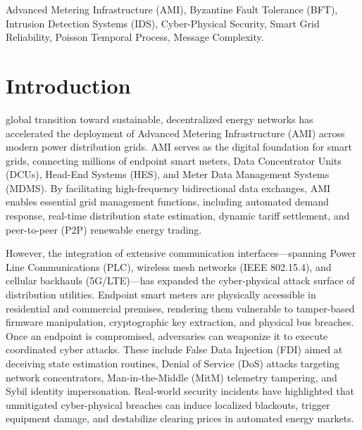 \documentclass[10pt,twocolumn,journal]{IEEEtran}
\begin{document}
\begin{IEEEkeywords}
Advanced Metering Infrastructure (AMI), Byzantine Fault Tolerance (BFT), Intrusion Detection Systems (IDS), Cyber-Physical Security, Smart Grid Reliability, Poisson Temporal Process, Message Complexity.
\end{IEEEkeywords}

\section{Introduction}
\label{sec:introduction}

 global transition toward sustainable, decentralized energy networks has accelerated the deployment of Advanced Metering Infrastructure (AMI) across modern power distribution grids. AMI serves as the digital foundation for smart grids, connecting millions of endpoint smart meters, Data Concentrator Units (DCUs), Head-End Systems (HES), and Meter Data Management Systems (MDMS). By facilitating high-frequency bidirectional data exchanges, AMI enables essential grid management functions, including automated demand response, real-time distribution state estimation, dynamic tariff settlement, and peer-to-peer (P2P) renewable energy trading.

However, the integration of extensive communication interfaces---spanning Power Line Communications (PLC), wireless mesh networks (IEEE 802.15.4), and cellular backhauls (5G/LTE)---has expanded the cyber-physical attack surface of distribution utilities. Endpoint smart meters are physically accessible in residential and commercial premises, rendering them vulnerable to tamper-based firmware manipulation, cryptographic key extraction, and physical bus breaches. Once an endpoint is compromised, adversaries can weaponize it to execute coordinated cyber attacks. These include False Data Injection (FDI) aimed at deceiving state estimation routines, Denial of Service (DoS) attacks targeting network concentrators, Man-in-the-Middle (MitM) telemetry tampering, and Sybil identity impersonation. Real-world security incidents have highlighted that unmitigated cyber-physical breaches can induce localized blackouts, trigger equipment damage, and destabilize clearing prices in automated energy markets.
\end{document}
